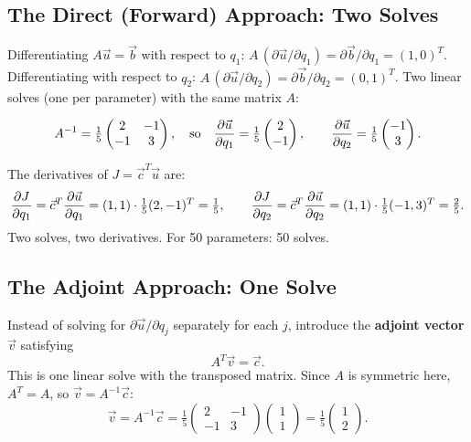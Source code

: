 \subsection*{The Direct (Forward) Approach: Two Solves}

Differentiating $A\vec{u} = \vec{b}$ with respect to $q_1$:
$A\,(\partial\vec{u}/\partial q_1) = \partial\vec{b}/\partial q_1 = (1,0)^T$.
Differentiating with respect to $q_2$:
$A\,(\partial\vec{u}/\partial q_2) = \partial\vec{b}/\partial q_2 = (0,1)^T$.
Two linear solves (one per parameter) with the same matrix $A$:

\[
  A^{-1} = \tfrac{1}{5}\begin{pmatrix} 2 & -1 \\ -1 & 3 \end{pmatrix},
  \quad\text{so}\quad
  \frac{\partial \vec{u}}{\partial q_1} = \tfrac{1}{5}\begin{pmatrix}2\\-1\end{pmatrix},
  \qquad
  \frac{\partial \vec{u}}{\partial q_2} = \tfrac{1}{5}\begin{pmatrix}-1\\3\end{pmatrix}.
\]

The derivatives of $J = \vec{c}^T\vec{u}$ are:
\[
  \frac{\partial J}{\partial q_1} = \vec{c}^T\frac{\partial \vec{u}}{\partial q_1}
              = (1,1)\cdot\tfrac{1}{5}(2,-1)^T = \tfrac{1}{5},
  \qquad
  \frac{\partial J}{\partial q_2} = \vec{c}^T\frac{\partial \vec{u}}{\partial q_2}
              = (1,1)\cdot\tfrac{1}{5}(-1,3)^T = \tfrac{2}{5}.
\]
Two solves, two derivatives. For 50 parameters: 50 solves.

\subsection*{The Adjoint Approach: One Solve}

Instead of solving for $\partial\vec{u}/\partial q_j$ separately for each $j$,
introduce the \textbf{adjoint vector} $\vec{v}$ satisfying
\begin{equation}
  A^T\vec{v} = \vec{c}.
  \label{eq:preview_adjoint}
\end{equation}
This is one linear solve with the transposed matrix.
Since $A$ is symmetric here, $A^T = A$, so $\vec{v} = A^{-1}\vec{c}$:
\[
  \vec{v} = A^{-1}\vec{c} = \tfrac{1}{5}\begin{pmatrix}2&-1\\-1&3\end{pmatrix}\begin{pmatrix}1\\1\end{pmatrix}
          = \tfrac{1}{5}\begin{pmatrix}1\\2\end{pmatrix}.
\]

